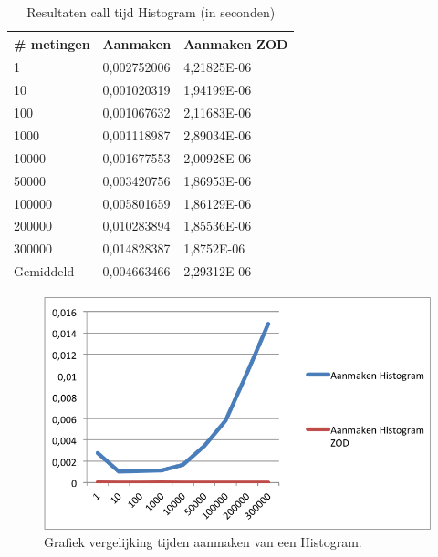 \begin{table}[]
\centering
\begin{tabular}{|l|l|l|}
\hline
\# metingen & Aanmaken    & Aanmaken ZOD \\ \hline
1           & 0,002752006 & 4,21825E-06  \\ \hline
10          & 0,001020319 & 1,94199E-06  \\ \hline
100         & 0,001067632 & 2,11683E-06  \\ \hline
1000        & 0,001118987 & 2,89034E-06  \\ \hline
10000       & 0,001677553 & 2,00928E-06  \\ \hline
50000       & 0,003420756 & 1,86953E-06  \\ \hline
100000      & 0,005801659 & 1,86129E-06  \\ \hline
200000      & 0,010283894 & 1,85536E-06  \\ \hline
300000      & 0,014828387 & 1,8752E-06   \\ \hline
Gemiddeld   & 0,004663466 & 2,29312E-06  \\ \hline
\end{tabular}
\caption{Resultaten call tijd Histogram (in seconden)}
\label{Table:Histogram}
\end{table}

\begin{figure}[!h]
  \centering
  \includegraphics[scale=1.0]{Afbeeldingen/Evaluatie/AanmakenHistogram}
  \caption{Grafiek vergelijking tijden aanmaken van een Histogram.}
  \label{fig:GraphHistogram}
\end{figure}


